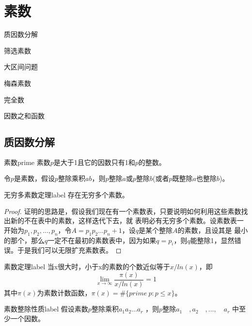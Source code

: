 \chapter{素数}
\begin{introduction}[本章内容提要]
	\item 质因数分解
	\item 筛选素数
	\item 大区间问题
	\item 梅森素数
	\item 完全数
	\item 因数之和函数
\end{introduction}

\section{质因数分解}
\begin{definition}{素数}{prime}
	素数$p$是大于1且它的因数只有1和$p$的整数。
\end{definition}

\begin{property}
	\label{pro:prime}
	令$p$是素数，假设$p$整除乘积$ab$，则$p$整除$a$或$p$整除$b$(或者$p$既整除$a$也整除$b$)。  
\end{property}

\begin{theorem}{无穷多素数定理}{label}
	存在无穷多个素数。
\end{theorem}

\begin{proof}
	证明的思路是，假设我们现在有一个素数表，只要说明如何利用这些素数找出新的不在表中的素数，这样迭代下去，就
表明必有无穷多个素数。设素数表一开始为$p_1,p_2,...,p_n$，令$A = p_1p_2...p_n + 1$，设$q$是某个整除$A$的素数，且设其是
最小的那个，那么$q$一定不在最初的素数表中，因为如果$q=p_i$，则$q$能整除1，显然错误。于是我们可以无限扩充素数表。
\end{proof}

\begin{theorem}{素数定理}{label}
	当x很大时，小于x的素数的个数近似等于$x/ln(x)$，即
	$$
	\lim_{x\to\infty} \frac{\pi(x)}{x/ln(x)}=1
	$$
	其中$\pi(x)$为素数计数函数，$\pi(x) = \#\{prime\ p:p\le x\}$。
\end{theorem}

\begin{theorem}{素数整除性质}{label}
假设素数$p$整除乘积$a_1a_2...a_r$ ，则$p$整除$a_1 \quad ,a_2 \quad , ...,\quad a_r$ 中至少一个因数。
\end{theorem}

